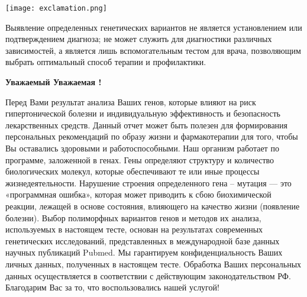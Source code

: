 \documentclass[russian,a4paper,12pt]{article}
\begin{document}
\vspace{-10mm}
\noindent
\parbox[b][3cm][t]{10mm}{
	\texttt{[image: exclamation.png]}}
\hfill
\parbox[b][3cm][t]{100mm}{
	Выявление определенных генетических вариантов не является установлением или подтверждением диагноза; не может служить для диагностики различных зависимостей, а является лишь вспомогательным тестом для врача, позволяющим выбрать оптимальный способ терапии и профилактики.}

\vspace{15mm}
\begin{center}
	\textbf{
		Уважаемый
		Уважаемая 
		!}
\end{center}

Перед Вами результат анализа Ваших генов, которые влияют на риск гипертонической болезни и индивидуальную эффективность и безопасность лекарственных средств. Данный отчет может быть полезен для формирования персональных рекомендаций по образу жизни и фармакотерапии для того, чтобы Вы оставались здоровыми и работоспособными.
Наш организм работает по программе, заложенной в генах. Гены определяют структуру и количество биологических молекул, которые обеспечивают те или иные процессы жизнедеятельности. Нарушение строения определенного гена – мутация — это «программная ошибка», которая может приводить к сбою биохимической реакции, лежащей в основе состояния, влияющего на качество жизни (появление болезни). 
Выбор полиморфных вариантов генов и методов их анализа, используемых в настоящем тесте, основан на результатах современных генетических исследований, представленных в международной базе данных научных публикаций Pubmed. 
Мы гарантируем конфиденциальность Ваших личных данных, полученных в настоящем тесте. Обработка Ваших персональных данных осуществляется в соответствии с действующим законодательством РФ.
Благодарим Вас за то, что воспользовались нашей услугой!
\end{document}
